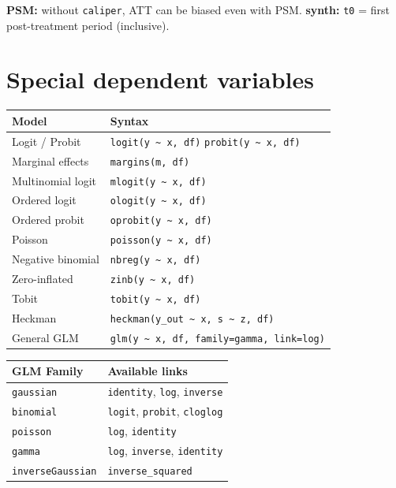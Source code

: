 {\footnotesize \textbf{PSM:} without \texttt{caliper}, ATT can be biased even with PSM.
\textbf{synth:} \texttt{t0} = first post-treatment period (inclusive).}

\section{Special dependent variables}

\begin{center}
\begin{tabular}{ll}
\toprule
\textbf{Model} & \textbf{Syntax} \\
\midrule
Logit / Probit     & \texttt{logit(y \textasciitilde{} x, df)} \quad \texttt{probit(y \textasciitilde{} x, df)} \\
Marginal effects   & \texttt{margins(m, df)} \\
Multinomial logit  & \texttt{mlogit(y \textasciitilde{} x, df)} \\
Ordered logit      & \texttt{ologit(y \textasciitilde{} x, df)} \\
Ordered probit     & \texttt{oprobit(y \textasciitilde{} x, df)} \\
\midrule
Poisson            & \texttt{poisson(y \textasciitilde{} x, df)} \\
Negative binomial  & \texttt{nbreg(y \textasciitilde{} x, df)} \\
Zero-inflated      & \texttt{zinb(y \textasciitilde{} x, df)} \\
\midrule
Tobit              & \texttt{tobit(y \textasciitilde{} x, df)} \\
Heckman            & \texttt{heckman(y\_out \textasciitilde{} x, s \textasciitilde{} z, df)} \\
\midrule
General GLM        & \texttt{glm(y \textasciitilde{} x, df, family=gamma, link=log)} \\
\bottomrule
\end{tabular}
\end{center}

\begin{center}
\begin{tabular}{ll}
\toprule
\textbf{GLM Family} & \textbf{Available links} \\
\midrule
\texttt{gaussian}  & \texttt{identity}, \texttt{log}, \texttt{inverse} \\
\texttt{binomial}  & \texttt{logit}, \texttt{probit}, \texttt{cloglog} \\
\texttt{poisson}   & \texttt{log}, \texttt{identity} \\
\texttt{gamma}     & \texttt{log}, \texttt{inverse}, \texttt{identity} \\
\texttt{inverseGaussian} & \texttt{inverse\_squared} \\
\bottomrule
\end{tabular}
\end{center}


